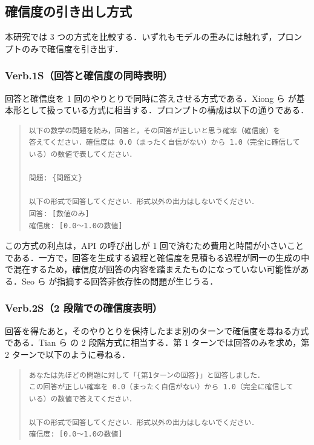 \subsection{確信度の引き出し方式}

本研究では 3 つの方式を比較する．いずれもモデルの重みには触れず，プロンプトのみで確信度を引き出す．

\subsubsection{Verb.1S（回答と確信度の同時表明）}

回答と確信度を 1 回のやりとりで同時に答えさせる方式である．Xiong ら \cite{xiong2024llmuncertainty} が基本形として扱っている方式に相当する．プロンプトの構成は以下の通りである．

\begin{quote}
\begin{verbatim}
以下の数学の問題を読み，回答と，その回答が正しいと思う確率（確信度）を
答えてください．確信度は 0.0（まったく自信がない）から 1.0（完全に確信して
いる）の数値で表してください．

問題: {問題文}

以下の形式で回答してください．形式以外の出力はしないでください．
回答: [数値のみ]
確信度: [0.0〜1.0の数値]
\end{verbatim}
\end{quote}

この方式の利点は，API の呼び出しが 1 回で済むため費用と時間が小さいことである．一方で，回答を生成する過程と確信度を見積もる過程が同一の生成の中で混在するため，確信度が回答の内容を踏まえたものになっていない可能性がある．Seo ら \cite{seo2025advice} が指摘する回答非依存性の問題が生じうる．

\subsubsection{Verb.2S（2 段階での確信度表明）}

回答を得たあと，そのやりとりを保持したまま別のターンで確信度を尋ねる方式である．Tian ら \cite{tian2023justask} の 2 段階方式に相当する．第 1 ターンでは回答のみを求め，第 2 ターンで以下のように尋ねる．

\begin{quote}
\begin{verbatim}
あなたは先ほどの問題に対して「{第1ターンの回答}」と回答しました．
この回答が正しい確率を 0.0（まったく自信がない）から 1.0（完全に確信して
いる）の数値で答えてください．

以下の形式で回答してください．形式以外の出力はしないでください．
確信度: [0.0〜1.0の数値]
\end{verbatim}
\end{quote}

